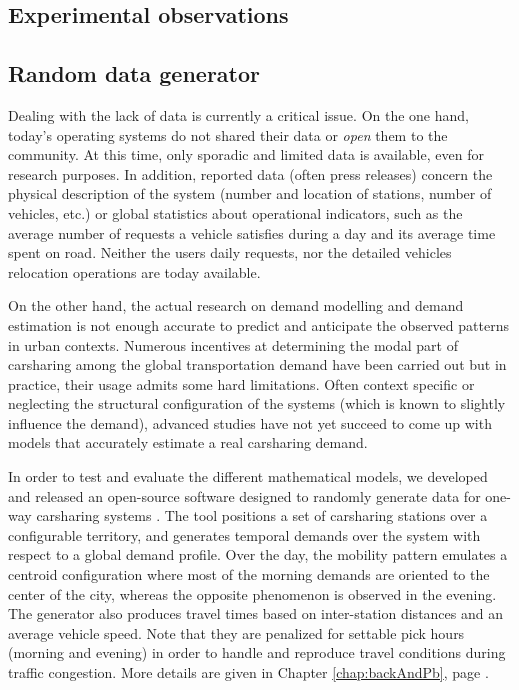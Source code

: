 
\subsection{Experimental observations}



\subsection{Random data generator}
Dealing with the lack of data is currently a critical issue. %
On the one hand, today's operating systems do not shared their data or \emph{open} them to the community.
At this time, only sporadic and limited data is available, even for research purposes.
In addition, reported data (often press releases) concern the physical description of the system (number and location of stations, number of vehicles, etc.) or global statistics about operational indicators, such as the average number of requests a vehicle satisfies during a day and its average time spent on road.
Neither the users daily requests, nor the detailed vehicles relocation operations are today available.

On the other hand, the actual research on demand modelling and demand estimation is not enough accurate to predict and anticipate the observed patterns in urban contexts.
Numerous incentives at determining the modal part of carsharing among the global transportation demand have been carried out but in practice, their usage admits some hard limitations.
Often context specific or neglecting the structural configuration of the systems (which is known to slightly influence the demand), advanced studies have not yet succeed to come up with models that accurately estimate a real carsharing demand.

\medskip
In order to test and evaluate the different mathematical models, we developed and released an open-source software designed to randomly generate data for one-way carsharing systems \cite{csgen}.
The tool positions a set of carsharing stations over a configurable territory, and generates temporal demands over the system with respect to a global demand profile.
Over the day, the mobility pattern emulates a centroid configuration where most of the morning demands are oriented to the center of the city, whereas the opposite phenomenon is observed in the evening.
The generator also produces travel times based on inter-station distances and an average vehicle speed.
Note that they are penalized for settable pick hours (morning and evening) in order to handle and reproduce travel conditions during traffic congestion.
More details are given in Chapter \ref{chap:backAndPb}, page \pageref{csgeneratorDescription}.

